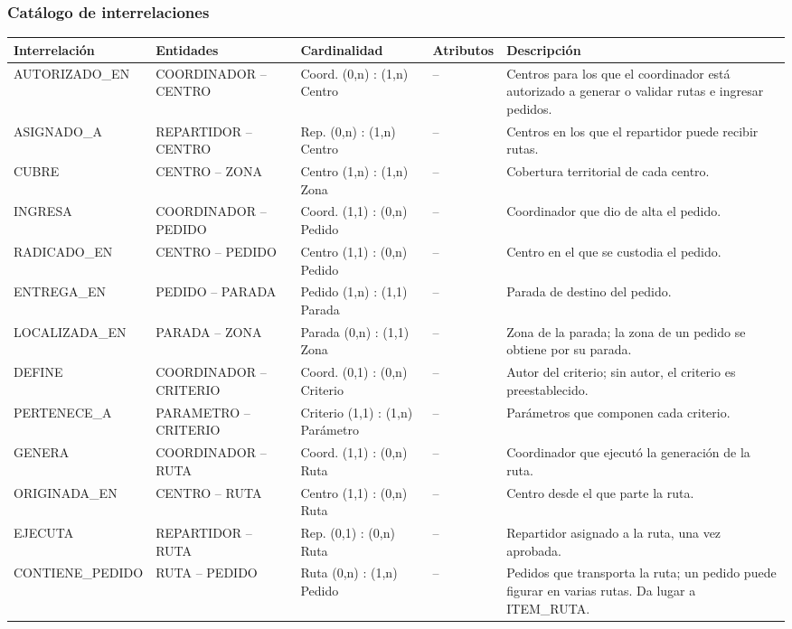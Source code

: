 \documentclass[11pt,a4paper]{article}
\begin{document}
\subsubsection*{Catálogo de interrelaciones}
{\small\setlength{\tabcolsep}{4pt}
\begin{longtable}{P{0.19\textwidth}P{0.23\textwidth}P{0.16\textwidth}P{0.12\textwidth}P{0.20\textwidth}}
\toprule
\textbf{Interrelación} & \textbf{Entidades} & \textbf{Cardinalidad} & \textbf{Atributos} & \textbf{Descripción}\\ \midrule
\endhead
AUTORIZADO\_EN & COORDINADOR -- CENTRO & Coord. (0,n) : (1,n) Centro & -- & Centros para los que el coordinador está autorizado a generar o validar rutas e ingresar pedidos.\\
ASIGNADO\_A & REPARTIDOR -- CENTRO & Rep. (0,n) : (1,n) Centro & -- & Centros en los que el repartidor puede recibir rutas.\\
CUBRE & CENTRO -- ZONA & Centro (1,n) : (1,n) Zona & -- & Cobertura territorial de cada centro.\\
INGRESA & COORDINADOR -- PEDIDO & Coord. (1,1) : (0,n) Pedido & -- & Coordinador que dio de alta el pedido.\\
RADICADO\_EN & CENTRO -- PEDIDO & Centro (1,1) : (0,n) Pedido & -- & Centro en el que se custodia el pedido.\\
ENTREGA\_EN & PEDIDO -- PARADA & Pedido (1,n) : (1,1) Parada & -- & Parada de destino del pedido.\\
LOCALIZADA\_EN & PARADA -- ZONA & Parada (0,n) : (1,1) Zona & -- & Zona de la parada; la zona de un pedido se obtiene por su parada.\\
DEFINE & COORDINADOR -- CRITERIO & Coord. (0,1) : (0,n) Criterio & -- & Autor del criterio; sin autor, el criterio es preestablecido.\\
PERTENECE\_A & PARAMETRO -- CRITERIO & Criterio (1,1) : (1,n) Parámetro & -- & Parámetros que componen cada criterio.\\
GENERA & COORDINADOR -- RUTA & Coord. (1,1) : (0,n) Ruta & -- & Coordinador que ejecutó la generación de la ruta.\\
ORIGINADA\_EN & CENTRO -- RUTA & Centro (1,1) : (0,n) Ruta & -- & Centro desde el que parte la ruta.\\
EJECUTA & REPARTIDOR -- RUTA & Rep. (0,1) : (0,n) Ruta & -- & Repartidor asignado a la ruta, una vez aprobada.\\
CONTIENE\_PEDIDO & RUTA -- PEDIDO & Ruta (0,n) : (1,n) Pedido & -- & Pedidos que transporta la ruta; un pedido puede figurar en varias rutas. Da lugar a ITEM\_RUTA.\\

\end{longtable}}
\end{document}

